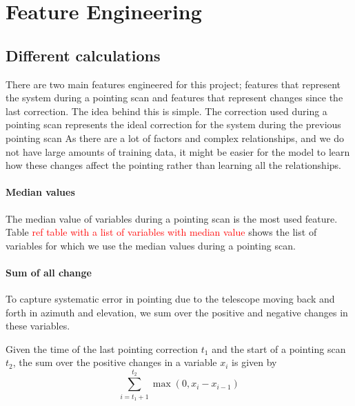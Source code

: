 \section{Feature Engineering}
\subsection{Different calculations}
There are two main features engineered for this project; features that represent the system during a pointing scan and features that represent changes since the last correction. 
The idea behind this is simple. The correction used during a pointing scan represents the ideal correction for the system during the previous pointing scan
As there are a lot of factors and complex relationships, and we do not have large amounts of training data, it might be easier for the model to learn 
how these changes affect the pointing rather than learning all the relationships.



\paragraph{Median values}
The median value of variables during a pointing scan is the most used feature.
Table \textcolor{red}{ref table with a list of variables with median value} shows the list of variables for which we use the median values during a pointing scan.
\paragraph{Sum of all change}
To capture systematic error in pointing due to the telescope moving back and forth in azimuth and elevation,
we sum over the positive and negative changes in these variables.

Given the time of the last pointing correction $t_1$ and the start of a pointing scan $t_2$, the sum over the positive changes in a variable $x_i$ is given by
\begin{equation}\label{eq:positive_int}
    \sum_{i=t_1+1}^{t_2} \max(0, x_i-x_{i-1})
\end{equation}

